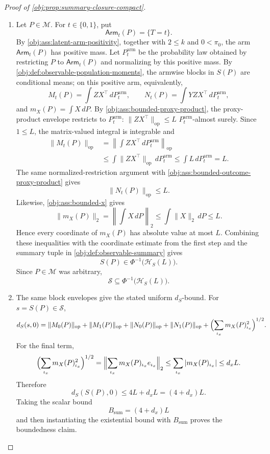\begin{proof}[Proof of \cref{obj:prop:summary-closure-compact}]
\begin{enumerate}
\item Let \(P\in\mathcal M\).  For \(t\in\{0,1\}\), put
\[
        \mathsf{Arm}_t(P)=\{T=t\}.
\]
By \cref{obj:ass:latent-arm-positivity}, together with \(2\le k\) and \(0<\pi_0\), the arm \(\mathsf{Arm}_t(P)\) has positive mass.  Let \(P^{\mathrm{arm}}_t\) be the probability law obtained by restricting \(P\) to \(\mathsf{Arm}_t(P)\) and normalizing by this positive mass.  By \cref{obj:def:observable-population-moments}, the armwise blocks in \(S(P)\) are conditional means; on this positive arm, equivalently,
\[
        M_t(P)=\int ZX^\top\,dP^{\mathrm{arm}}_t,
        \qquad
        N_t(P)=\int YZX^\top\,dP^{\mathrm{arm}}_t,
\]
and \(m_X(P)=\int X\,dP\).  By \cref{obj:ass:bounded-proxy-product}, the proxy-product envelope restricts to \(P^{\mathrm{arm}}_t\): \(\|ZX^\top\|_{\mathrm{op}}\le L\) \(P^{\mathrm{arm}}_t\)-almost surely.  Since \(1\le L\), the matrix-valued integral is integrable and
\[
\begin{aligned}
\|M_t(P)\|_{\mathrm{op}}
&=\left\|\int ZX^\top\,dP^{\mathrm{arm}}_t\right\|_{\mathrm{op}}  \\
&\le \int \|ZX^\top\|_{\mathrm{op}}\,dP^{\mathrm{arm}}_t
 \le \int L\,dP^{\mathrm{arm}}_t
 = L .
\end{aligned}
\]
The same normalized-restriction argument with \cref{obj:ass:bounded-outcome-proxy-product} gives
\[
        \|N_t(P)\|_{\mathrm{op}}\le L .
\]
Likewise, \cref{obj:ass:bounded-x} gives
\[
\|m_X(P)\|_2
=\left\|\int X\,dP\right\|_2
\le
\int \|X\|_2\,dP
\le L .
\]
Hence every coordinate of \(m_X(P)\) has absolute value at most \(L\).  Combining these inequalities with the coordinate estimate from the first step and the summary tuple in \cref{obj:def:observable-summary} gives
\[
        S(P)\in \Phi^{-1}\bigl(\mathcal H_S(L)\bigr).
\]
Since \(P\in\mathcal M\) was arbitrary,
\[
        \mathscr S\subseteq \Phi^{-1}\bigl(\mathcal H_S(L)\bigr).
\] %

\item The same block envelopes give the stated uniform \(d_S\)-bound.  For \(s=S(P)\in\mathscr S\),
\[
\begin{aligned}
d_S(s,0)
&=
\|M_0(P)\|_{\mathrm{op}}
+\|M_1(P)\|_{\mathrm{op}}
+\|N_0(P)\|_{\mathrm{op}}
+\|N_1(P)\|_{\mathrm{op}}
+\Bigl(\sum_{\iota_x} m_X(P)_{\iota_x}^2\Bigr)^{1/2}.
\end{aligned}
\]
For the final term,
\[
\Bigl(\sum_{\iota_x} m_X(P)_{\iota_x}^2\Bigr)^{1/2}
=
\Bigl\|\sum_{\iota_x} m_X(P)_{\iota_x} e_{\iota_x}\Bigr\|_2
\le
\sum_{\iota_x}|m_X(P)_{\iota_x}|
\le
d_x L.
\]
Therefore
\[
        d_S(S(P),0)\le 4L+d_xL=(4+d_x)L.
\]
Taking the scalar bound
\[
        B_{\mathrm{sum}}=(4+d_x)L
\]
and then instantiating the existential bound with \(B_{\mathrm{sum}}\) proves the boundedness claim. %


\end{enumerate}
\end{proof}
